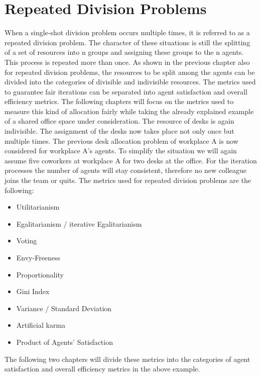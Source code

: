 \documentclass[german, a4paper, 11pt, oneside]{scrbook}
\begin{document}
\section{Repeated Division Problems}
When a single-shot division problem occurs multiple times, it is referred to as a repeated division problem. The character of these situations is still the splitting of a set of resources into n groups and assigning these groups to the n agents. This process is repeated more than once. As shown in the previous chapter also for repeated division problems, the resources to be split among the agents can be divided into the categories of divisible and indivisible resources. The metrics used to guarantee fair iterations can be separated into agent satisfaction and overall efficiency metrics. The following chapters will focus on the metrics used to measure this kind of allocation fairly while taking the already explained example of a shared office space under consideration. The resource of desks is again indivisible. The assignment of the desks now takes place not only once but multiple times. The previous desk allocation problem of workplace A is now considered for workplace A's agents. To simplify the situation we will again assume five coworkers at workplace A for two desks at the office. For the iteration processes the number of agents will stay consistent, therefore no new colleague joins the team or quits. The metrics used for repeated division problems are the following:
\begin{itemize}
  \item Utilitarianism
  \item Egalitarianism / iterative Egalitarianism
  \item Voting
  \item Envy-Freeness
  \item Proportionality
\item Gini Index
\item Variance / Standard Deviation
\item Artificial karma
\item Product of Agents' Satisfaction
\end{itemize}
The following two chapters will divide these metrics into the categories of agent satisfaction and overall efficiency metrics in the above example.
\end{document}
